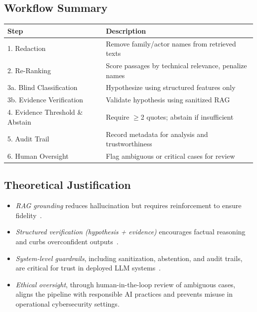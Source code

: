 \subsection{Workflow Summary}\label{subsec:GuardrailWorkflow}
\begin{center}
      \begin{tabular}{ll}
            \toprule
            \textbf{Step}                    & \textbf{Description}                                  \\
            \midrule
            1. Redaction                     & Remove family/actor names from retrieved texts        \\
            2. Re-Ranking                    & Score passages by technical relevance, penalize names \\
            3a. Blind Classification         & Hypothesize using structured features only            \\
            3b. Evidence Verification        & Validate hypothesis using sanitized RAG               \\
            4. Evidence Threshold \& Abstain & Require $\geq$2 quotes; abstain if insufficient       \\
            5. Audit Trail                   & Record metadata for analysis and trustworthiness      \\
            6. Human Oversight               & Flag ambiguous or critical cases for review           \\
            \bottomrule
      \end{tabular}
\end{center}

\subsection{Theoretical Justification}
\begin{itemize}
      \item \emph{RAG grounding} reduces hallucination but requires reinforcement to ensure
            fidelity~\cite{zhang2025hallucination, bechard2024reducing}.
      \item \emph{Structured verification (hypothesis + evidence)} encourages factual reasoning and
            curbs overconfident outputs~\cite{bechard2024reducing, lee2025finetune}.
      \item \emph{System-level guardrails}, including sanitization, abstention, and audit trails,
            are critical for trust in deployed LLM systems~\cite{han2025guardrail, magesh2025assessing}.
      \item \emph{Ethical oversight}, through human-in-the-loop review of ambiguous cases, aligns
            the pipeline with responsible AI practices and prevents misuse in operational cybersecurity settings.
\end{itemize}

